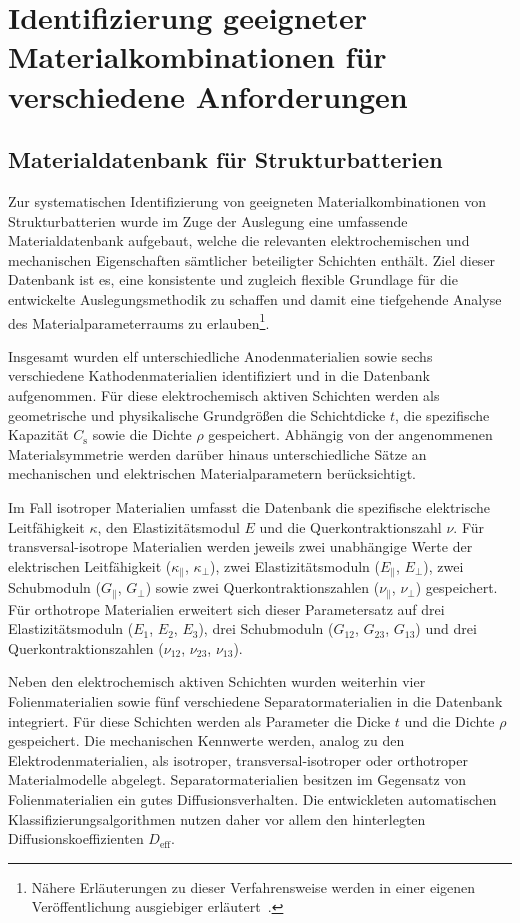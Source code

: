 \chapter{Identifizierung geeigneter Materialkombinationen für verschiedene Anforderungen}\label{sec:battery_identification}
\section{Materialdatenbank für Strukturbatterien}\label{sec:digitalisation}

Zur systematischen Identifizierung von geeigneten Materialkombinationen von Strukturbatterien wurde im Zuge der Auslegung eine umfassende Materialdatenbank aufgebaut, welche die relevanten elektrochemischen und mechanischen Eigenschaften sämtlicher beteiligter Schichten enthält. Ziel dieser Datenbank ist es, eine konsistente und zugleich flexible Grundlage für die entwickelte Auslegungsmethodik zu schaffen und damit eine tiefgehende Analyse des Materialparameterraums zu erlauben\footnote{Nähere Erläuterungen zu dieser Verfahrensweise werden in einer eigenen Veröffentlichung ausgiebiger erläutert~\cite{zschiebsch2024multifunctional}.}.

Insgesamt wurden elf unterschiedliche Anodenmaterialien sowie sechs verschiedene Kathodenmaterialien identifiziert und in die Datenbank aufgenommen. Für diese elektrochemisch aktiven Schichten werden als geometrische und physikalische Grundgrößen die Schichtdicke $t$, die spezifische Kapazität $C_\mathrm{s}$ sowie die Dichte $\rho$ gespeichert. Abhängig von der angenommenen Materialsymmetrie werden darüber hinaus unterschiedliche Sätze an mechanischen und elektrischen Materialparametern berücksichtigt. 

Im Fall isotroper Materialien umfasst die Datenbank die spezifische elektrische Leitfähigkeit $\kappa$, den Elastizitätsmodul $E$ und die Querkontraktionszahl $\nu$. Für transversal-isotrope Materialien werden jeweils zwei unabhängige Werte der elektrischen Leitfähigkeit ($\kappa_\parallel$, $\kappa_\perp$), zwei Elastizitätsmoduln ($E_\parallel$, $E_\perp$), zwei Schubmoduln ($G_\parallel$, $G_\perp$) sowie zwei Querkontraktionszahlen ($\nu_\parallel$, $\nu_\perp$) gespeichert. Für orthotrope Materialien erweitert sich dieser Parametersatz auf drei Elastizitätsmoduln ($E_1$, $E_2$, $E_3$), drei Schubmoduln ($G_{12}$, $G_{23}$, $G_{13}$) und drei Querkontraktionszahlen ($\nu_{12}$, $\nu_{23}$, $\nu_{13}$).

Neben den elektrochemisch aktiven Schichten wurden weiterhin vier Folienmaterialien sowie fünf verschiedene Separatormaterialien in die Datenbank integriert. Für diese Schichten werden als Parameter die Dicke $t$ und die Dichte $\rho$ gespeichert. Die mechanischen Kennwerte werden, analog zu den Elektrodenmaterialien, als isotroper, transversal-isotroper oder orthotroper Materialmodelle abgelegt. Separatormaterialien besitzen im Gegensatz von Folienmaterialien ein gutes Diffusionsverhalten. Die entwickleten automatischen Klassifizierungsalgorithmen nutzen daher vor allem den hinterlegten Diffusionskoeffizienten $D_\mathrm{eff}$.

